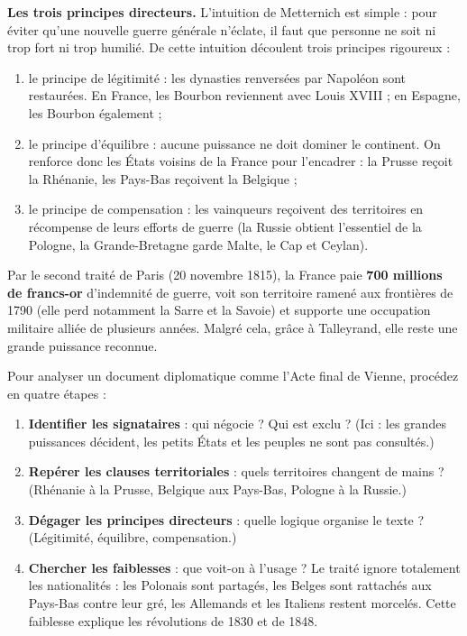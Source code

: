 \documentclass[11pt]{article}
\newcommand{\cle}[1]{{\popxbold\color{popdark}#1}}
\begin{document}
\textbf{Les trois principes directeurs.} L'intuition de Metternich est simple : pour éviter qu'une nouvelle guerre générale n'éclate, il faut que personne ne soit ni trop fort ni trop humilié. De cette intuition découlent trois principes rigoureux :
\begin{enumerate}
\item le principe de \cle{légitimité} : les dynasties renversées par Napoléon sont restaurées. En France, les Bourbon reviennent avec Louis XVIII ; en Espagne, les Bourbon également ;
\item le principe d'\cle{équilibre} : aucune puissance ne doit dominer le continent. On renforce donc les États voisins de la France pour l'encadrer : la Prusse reçoit la Rhénanie, les Pays-Bas reçoivent la Belgique ;
\item le principe de \cle{compensation} : les vainqueurs reçoivent des territoires en récompense de leurs efforts de guerre (la Russie obtient l'essentiel de la Pologne, la Grande-Bretagne garde Malte, le Cap et Ceylan).
\end{enumerate}

\begin{exemplebox}
Par le second traité de Paris (20 novembre 1815), la France paie \textbf{700 millions de francs-or} d'indemnité de guerre, voit son territoire ramené aux frontières de 1790 (elle perd notamment la Sarre et la Savoie) et supporte une occupation militaire alliée de plusieurs années. Malgré cela, grâce à Talleyrand, elle reste une grande puissance reconnue.
\end{exemplebox}

\begin{methode}
Pour analyser un document diplomatique comme l'Acte final de Vienne, procédez en quatre étapes :
\begin{enumerate}
\item \textbf{Identifier les signataires} : qui négocie ? Qui est exclu ? (Ici : les grandes puissances décident, les petits États et les peuples ne sont pas consultés.)
\item \textbf{Repérer les clauses territoriales} : quels territoires changent de mains ? (Rhénanie à la Prusse, Belgique aux Pays-Bas, Pologne à la Russie.)
\item \textbf{Dégager les principes directeurs} : quelle logique organise le texte ? (Légitimité, équilibre, compensation.)
\item \textbf{Chercher les faiblesses} : que voit-on à l'usage ? Le traité ignore totalement les \cle{nationalités} : les Polonais sont partagés, les Belges sont rattachés aux Pays-Bas contre leur gré, les Allemands et les Italiens restent morcelés. Cette faiblesse explique les révolutions de 1830 et de 1848.
\end{enumerate}
\end{methode}
\end{document}
